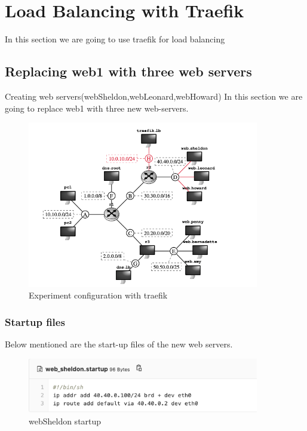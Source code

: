 \chapter{Load Balancing with Traefik}
In this section we are going to use traefik for load balancing 
\section{Replacing web1 with three web servers}
{Creating web servers(web\textunderscore Sheldon,web\textunderscore Leonard,web\textunderscore Howard)}
In this section we are going to replace web1 with three new web-servers. 
\begin{figure}[H]
\centering
  \includegraphics[width=0.9\textwidth]{Images/Replacing web1 with three new webservers..png}
  \caption{Experiment configuration with traefik}
  \label{fig:3.1}
\end{figure}
\subsection{Startup files}
Below mentioned are the start-up files of the new web servers.

\begin{figure}[H]
\centering
  \includegraphics[width=0.9\textwidth]{Images/web_sheldon startup.png}
  \caption{web\textunderscore Sheldon startup}
  \label{fig:3.2}
\end{figure}

